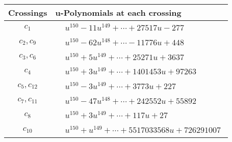 \documentclass[1p]{elsarticle_modified}
\theoremstyle{definition}
\begin{document}
\begin{tabular}{m{50pt}|m{274pt}}
Crossings & \hspace{64pt}u-Polynomials at each crossing \\
\hline $$\begin{aligned}c_{1}\end{aligned}$$&$\begin{aligned}
&u^{150}-11 u^{149}+\cdots+27517 u-277
\end{aligned}$\\
\hline $$\begin{aligned}c_{2},c_{9}\end{aligned}$$&$\begin{aligned}
&u^{150}-62 u^{148}+\cdots-11776 u+448
\end{aligned}$\\
\hline $$\begin{aligned}c_{3},c_{6}\end{aligned}$$&$\begin{aligned}
&u^{150}+5 u^{149}+\cdots+25271 u+3637
\end{aligned}$\\
\hline $$\begin{aligned}c_{4}\end{aligned}$$&$\begin{aligned}
&u^{150}+3 u^{149}+\cdots+1401453 u+97263
\end{aligned}$\\
\hline $$\begin{aligned}c_{5},c_{12}\end{aligned}$$&$\begin{aligned}
&u^{150}-3 u^{149}+\cdots+3773 u+227
\end{aligned}$\\
\hline $$\begin{aligned}c_{7},c_{11}\end{aligned}$$&$\begin{aligned}
&u^{150}-47 u^{148}+\cdots+242552 u+55892
\end{aligned}$\\
\hline $$\begin{aligned}c_{8}\end{aligned}$$&$\begin{aligned}
&u^{150}+3 u^{149}+\cdots+117 u+27
\end{aligned}$\\
\hline $$\begin{aligned}c_{10}\end{aligned}$$&$\begin{aligned}
&u^{150}+u^{149}+\cdots+5517033568 u+726291007
\end{aligned}$\\
\hline
\end{tabular}\\~\\
\end{document}
